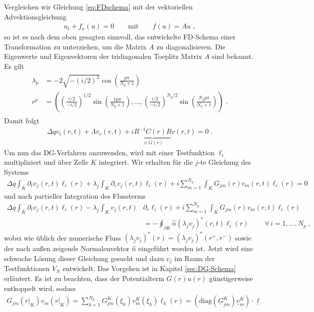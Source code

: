 Vergleichen wir Gleichung \eqref{eq:FDschema} mit der vektoriellen Advektionsgleichung
\begin{align}
  u_t + f_x(u) = 0 \qquad \text{mit} \qquad
  f(u) = Au \; ,
\end{align}
so ist es nach dem oben gesagten sinnvoll, das entwickelte FD-Schema einer Transformation zu unterziehen, um die Matrix $A$ zu diagonalisieren. Die Eigenwerte und Eigenvektoren der tridiagonalen Toeplitz Matrix $A$ sind bekannt. Es gilt
\begin{gather}
\begin{align}
  \lambda_p &= -2\sqrt{-(i/2)^2}\cos\left(\frac{p\pi}{N_q+1}\right) \\
  r^p &= \left( \left( \frac{i/2}{-i/2} \right)^{1/2} \sin \left( \frac{1 p\pi }{N_q+1} \right), \ldots , \left( \frac{i/2}{-i/2} \right)^{N_q/2} \sin \left( \frac{N_q p \pi}{N_q+1} \right) \right) \; .
\end{align}
\end{gather}
Damit folgt
\begin{align}
  \Delta q v_t(r,t) + \Lambda v_r(r,t) + i \underbrace{R^{-1}C(r)R}_{\equiv G(r)} v(r,t) = 0 \; .
  \label{eq:lvn_diagonalisiert}
\end{align}
Um nun das DG-Verfahren anzuwenden, wird mit einer Testfunktion $\ell_i$ multipliziert und über Zelle $K$ integriert. Wir erhalten für die $j$-te Gleichung des Systems
\begin{align*}
  \Delta q \int_K \partial_t v_j(r,t)\ell_i(r) + \lambda_j \int_K \partial_r v_j(r,t) \ell_i(r) + i \sum_{m=1}^{N_q} \int_K G_{jm}(r) v_m(r,t) \ell_i(r) = 0
\end{align*}
und nach partieller Integration des Flussterms
\begin{align*}
  \Delta q \int_K \partial_t v_j(r,t)\ell_i(r) - \lambda_j \int_K v_j(r,t) &\partial_r\ell_i(r) + i \sum_{m=1}^{N_q} \int_K G_{jm}(r) v_m(r,t) \ell_i(r)\\
      &= - \oint_{\partial K}  \hat{n} (\lambda_j v_j)^*(r,t)\ell_i(r) \;  \qquad \forall\, i=1,\dots,N_p \;,
\end{align*}
wobei wie üblich der numerische Fluss $(\lambda_j v_j)^*(r) = (\lambda_j v_j)^*(r^+, r^-)$ sowie der nach außen zeigende Normalenvektor $\hat{n}$ eingeführt worden ist. Jetzt wird eine schwache Lösung dieser Gleichung gesucht und dazu $v_j$ im Raum der Testfunktionen $V_N$ entwickelt. Das Vorgehen ist in Kapitel \ref{sec:DG-Schema} erläutert. Es ist zu beachten, dass der Potentialterm $G(r)u(r)$ günstigerweise entkoppelt wird, sodass
\begin{align}
  G_{jm}(r|_K)v_m(r|_K)  = \sum_{k=1}^{N_p} G_{jm}^K(\xi_k)v_m^K(\xi_k) \ell_k(r) = \left(\text{diag}(\underline{G}_{jm}^K) \underline{v}_m^K\right) \cdot \underline{ \ell }
\end{align}
